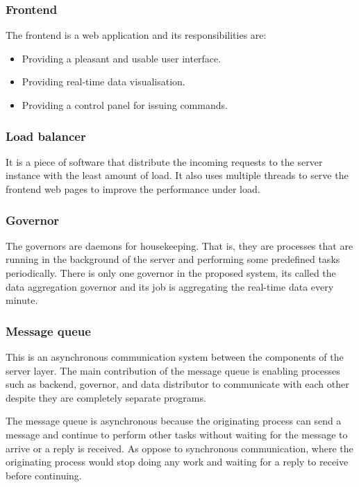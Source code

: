 \documentclass[../thesis.tex]{subfiles}
\begin{document}
\subsubsection{Frontend}

The frontend is a web application and its responsibilities are:

\begin{itemize}
\item Providing a pleasant and usable user interface.
\item Providing real-time data visualisation.
\item Providing a control panel for issuing commands.
\end{itemize}

\subsubsection{Load balancer}

It is a piece of software that distribute the incoming requests to the server instance with the least amount of load. It also uses multiple threads to serve the frontend web pages to improve the performance under load.

\subsubsection{Governor}

The governors are daemons for housekeeping. That is, they are processes that are running in the background of the server and performing some predefined tasks periodically. There is only one governor in the proposed system, its called the data aggregation governor and its job is aggregating the real-time data every minute.

\subsubsection{Message queue}

This is an asynchronous communication system between the components of the server layer. The main contribution of the message queue is enabling processes such as backend, governor, and data distributor to communicate with each other despite they are completely separate programs.

The message queue is asynchronous because the originating process can send a message and continue to perform other tasks without waiting for the message to arrive or a reply is received. As oppose to synchronous communication, where the originating process would stop doing any work and waiting for a reply to receive before continuing.
\end{document}
